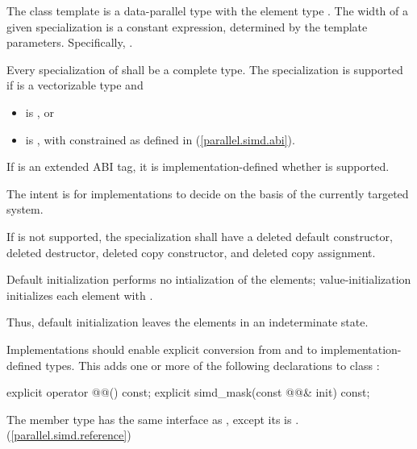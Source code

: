\pnum
The class template  is a data-parallel type with the element type . The width of a given  specialization is a constant expression, determined by the template parameters. Specifically, .

\pnum
Every specialization of  shall be a complete type. The specialization  is supported if  is a vectorizable type and

\begin{itemize}
  \item {} is , or
  \item {} is , with  constrained as defined in (\ref{parallel.simd.abi}).
\end{itemize}

If  is an extended ABI tag, it is implementation-defined whether  is supported. \begin{note}The intent is for implementations to decide on the basis of the currently targeted system.\end{note}
If  is not supported, the specialization shall have a deleted default constructor, deleted destructor, deleted copy constructor, and deleted copy assignment.

\pnum
Default initialization performs no intialization of the elements; value-initialization initializes each element with . \begin{note}Thus, default initialization leaves the elements in an indeterminate state.\end{note}

\pnum
Implementations should enable explicit conversion from and to implementation-defined types. This adds one or more of the following declarations to class :

\begin{codeblock}
explicit operator @@() const;
explicit simd_mask(const @@& init) const;
\end{codeblock}

\pnum
The member type  has the same interface as , except its  is . (\ref{parallel.simd.reference})

